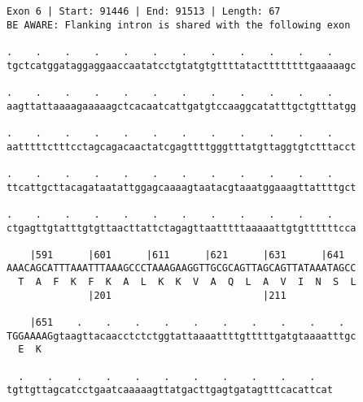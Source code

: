 \documentclass{article}
\begin{document}
\begin{Verbatim}
Exon 6 | Start: 91446 | End: 91513 | Length: 67
BE AWARE: Flanking intron is shared with the following exon
 
.    .    .    .    .    .    .    .    .    .    .    .    
tgctcatggataggaggaaccaatatcctgtatgtgttttatacttttttttgaaaaagc
  
.    .    .    .    .    .    .    .    .    .    .    .    
aagttattaaaagaaaaagctcacaatcattgatgtccaaggcatatttgctgtttatgg
  
.    .    .    .    .    .    .    .    .    .    .    .    
aatttttctttcctagcagacaactatcgagttttgggtttatgttaggtgtctttacct
  
.    .    .    .    .    .    .    .    .    .    .    .    
ttcattgcttacagataatattggagcaaaagtaatacgtaaatggaaagttattttgct
  
.    .    .    .    .    .    .    .    .    .    .    .    
ctgagttgtatttgtgttaacttattctagagttaatttttaaaaattgtgttttttcca
  
    |591      |601      |611      |621      |631      |641  
AAACAGCATTTAAATTTAAAGCCCTAAAGAAGGTTGCGCAGTTAGCAGTTATAAATAGCC
  T  A  F  K  F  K  A  L  K  K  V  A  Q  L  A  V  I  N  S  L
              |201                          |211            
  
    |651    .    .    .    .    .    .    .    .    .    .  
TGGAAAAGgtaagttacaacctctctggtattaaaattttgtttttgatgtaaaatttgc
  E  K                                                      
  
  .    .    .    .    .    .    .    .    .    .    .   
tgttgttagcatcctgaatcaaaaagttatgacttgagtgatagtttcacattcat
\end{Verbatim}
\newpage
\end{document}

